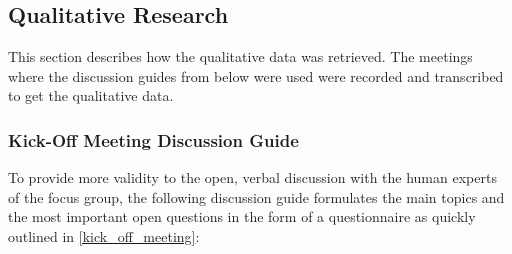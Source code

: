 \documentclass[draft,final]{thesisclass} %
\begin{document}
\subsection{Qualitative Research}
This section describes how the qualitative data was retrieved.
The meetings where the discussion guides from below were used were recorded and transcribed to get the qualitative data.

\subsubsection{Kick-Off Meeting Discussion Guide}
To provide more validity to the open, verbal discussion with the human experts of the focus group, the following discussion guide formulates the main topics and the most important open questions in the form of a questionnaire as quickly outlined in \ref{kick_off_meeting}:
\end{document}
